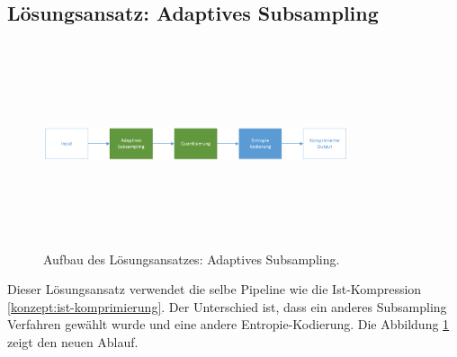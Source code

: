 \subsection{Lösungsansatz: Adaptives Subsampling} \label{konzept:loesung0}
\begin{figure}[!htbp]
	\center
	\includegraphics[width=0.8\textwidth,height=6cm,keepaspectratio]{./pictures/konzept/solution0/aufbau.png}
	\caption{Aufbau des Lösungsansatzes: Adaptives Subsampling.}
	\label{konzept:loesung0:aufbau:diagramm}
\end{figure} 
Dieser Lösungsansatz verwendet die selbe Pipeline wie die Ist-Kompression \ref{konzept:ist-komprimierung}. Der Unterschied ist, dass ein anderes Subsampling Verfahren gewählt wurde und eine andere Entropie-Kodierung. Die Abbildung \ref{konzept:loesung0:aufbau:diagramm} zeigt den neuen Ablauf. 

